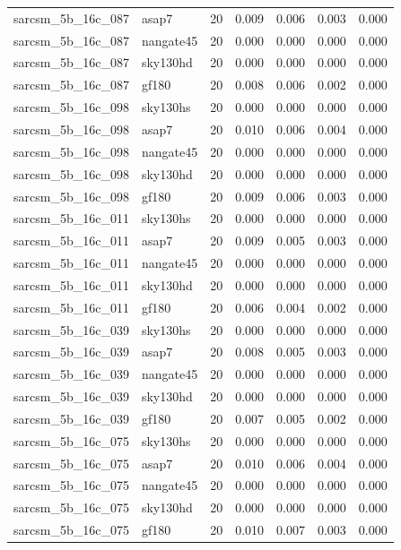 \begin{tabular}{llrrrrr}
sarcsm\_5b\_16c\_087 & asap7 & 20 & 0.009 & 0.006 & 0.003 & 0.000 \\
sarcsm\_5b\_16c\_087 & nangate45 & 20 & 0.000 & 0.000 & 0.000 & 0.000 \\
sarcsm\_5b\_16c\_087 & sky130hd & 20 & 0.000 & 0.000 & 0.000 & 0.000 \\
sarcsm\_5b\_16c\_087 & gf180 & 20 & 0.008 & 0.006 & 0.002 & 0.000 \\
sarcsm\_5b\_16c\_098 & sky130hs & 20 & 0.000 & 0.000 & 0.000 & 0.000 \\
sarcsm\_5b\_16c\_098 & asap7 & 20 & 0.010 & 0.006 & 0.004 & 0.000 \\
sarcsm\_5b\_16c\_098 & nangate45 & 20 & 0.000 & 0.000 & 0.000 & 0.000 \\
sarcsm\_5b\_16c\_098 & sky130hd & 20 & 0.000 & 0.000 & 0.000 & 0.000 \\
sarcsm\_5b\_16c\_098 & gf180 & 20 & 0.009 & 0.006 & 0.003 & 0.000 \\
sarcsm\_5b\_16c\_011 & sky130hs & 20 & 0.000 & 0.000 & 0.000 & 0.000 \\
sarcsm\_5b\_16c\_011 & asap7 & 20 & 0.009 & 0.005 & 0.003 & 0.000 \\
sarcsm\_5b\_16c\_011 & nangate45 & 20 & 0.000 & 0.000 & 0.000 & 0.000 \\
sarcsm\_5b\_16c\_011 & sky130hd & 20 & 0.000 & 0.000 & 0.000 & 0.000 \\
sarcsm\_5b\_16c\_011 & gf180 & 20 & 0.006 & 0.004 & 0.002 & 0.000 \\
sarcsm\_5b\_16c\_039 & sky130hs & 20 & 0.000 & 0.000 & 0.000 & 0.000 \\
sarcsm\_5b\_16c\_039 & asap7 & 20 & 0.008 & 0.005 & 0.003 & 0.000 \\
sarcsm\_5b\_16c\_039 & nangate45 & 20 & 0.000 & 0.000 & 0.000 & 0.000 \\
sarcsm\_5b\_16c\_039 & sky130hd & 20 & 0.000 & 0.000 & 0.000 & 0.000 \\
sarcsm\_5b\_16c\_039 & gf180 & 20 & 0.007 & 0.005 & 0.002 & 0.000 \\
sarcsm\_5b\_16c\_075 & sky130hs & 20 & 0.000 & 0.000 & 0.000 & 0.000 \\
sarcsm\_5b\_16c\_075 & asap7 & 20 & 0.010 & 0.006 & 0.004 & 0.000 \\
sarcsm\_5b\_16c\_075 & nangate45 & 20 & 0.000 & 0.000 & 0.000 & 0.000 \\
sarcsm\_5b\_16c\_075 & sky130hd & 20 & 0.000 & 0.000 & 0.000 & 0.000 \\
sarcsm\_5b\_16c\_075 & gf180 & 20 & 0.010 & 0.007 & 0.003 & 0.000 \\

\end{tabular}
